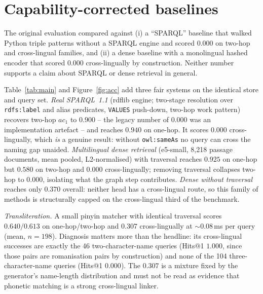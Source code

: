 \documentclass[a4paper,fleqn]{cas-dc}
\newcommand{\ac}[0]{\ensuremath{ac_1}}
\begin{document}
\section{Capability-corrected baselines}\label{sec:baselines}
The original evaluation compared against (i) a ``SPARQL'' baseline that walked
Python triple patterns without a SPARQL engine and scored 0.000 on two-hop and
cross-lingual families, and (ii) a dense baseline with a monolingual hashed
encoder that scored 0.000 cross-lingually by construction. Neither number
supports a claim about SPARQL or dense retrieval in general.

Table~\ref{tab:main} and Figure~\ref{fig:acc} add three fair systems on the
identical store and query set. \emph{Real SPARQL~1.1} (rdflib engine; two-stage
resolution over \texttt{rdfs:label} and alias predicates, \texttt{VALUES}
push-down, two-hop work pattern) recovers two-hop \ac{} to $0.900$ -- the legacy
number of $0.000$ was an implementation artefact -- and reaches $0.940$ on
one-hop. It scores $0.000$ cross-lingually, which \emph{is} a genuine result:
without \texttt{owl:sameAs} no query can cross the naming gap unaided.
\emph{Multilingual dense retrieval} (e5-small, 8{,}218 passage documents, mean
pooled, L2-normalised) with traversal reaches $0.925$ on one-hop but $0.580$
on two-hop and $0.000$ cross-lingually; removing traversal collapses two-hop
to $0.000$, isolating what the graph step contributes. \emph{Dense without
traversal} reaches only $0.370$ overall: neither head has a cross-lingual
route, so this family of methods is structurally capped on the cross-lingual
third of the benchmark.

\emph{Transliteration.} A small pinyin matcher with identical traversal scores
$0.640/0.613$ on one-hop/two-hop and $0.307$ cross-lingually at $\sim$0.08\,ms
per query (mean, $n=198$). Diagnosis matters more than the headline: its
cross-lingual successes are exactly the 46 two-character-name queries (Hits@1
$1.000$, since those pairs are romanisation pairs by construction) and none of
the 104 three-character-name queries (Hits@1 $0.000$). The $0.307$ is a mixture
fixed by the generator's name-length distribution and must not be read as
evidence that phonetic matching is a strong cross-lingual linker.
\end{document}
